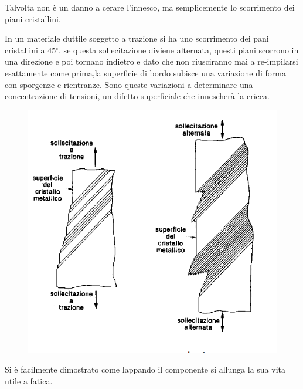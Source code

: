 		Talvolta non è un danno a cerare l'innesco, ma semplicemente lo scorrimento dei piani cristallini.
		
		In un materiale duttile soggetto a trazione si ha uno scorrimento dei pani cristallini a 45$^\circ$, se questa sollecitazione diviene alternata, questi piani scorrono in una direzione e poi tornano indietro e dato che non riusciranno mai a re-impilarsi esattamente come prima,la superficie di bordo subisce una variazione di forma con sporgenze e rientranze. Sono queste variazioni a determinare una concentrazione di tensioni, un difetto superficiale che innescherà la cricca. 
		
		\begin{figure}[H]
			\centering
			\includegraphics[width=0.25\linewidth]{immagini_10/screenshot007}
			\label{fig:screenshot007}
		\end{figure}		 
	
		Si è facilmente dimostrato come lappando il componente si allunga la sua vita utile a fatica. 
		
